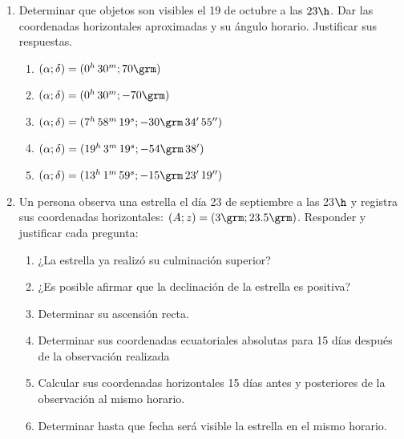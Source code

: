 \begin{enumerate}
  \item Determinar que objetos son visibles el 19 de octubre a las $23\h$. Dar
    las coordenadas horizontales aproximadas y su ángulo horario. Justificar sus
    respuestas.
    \begin{enumerate}
      \item $(\alpha;\delta)=(0^h\, 30^m;70\grm)$
      \item $(\alpha;\delta)=(0^h\, 30^m;-70\grm)$
      \item $(\alpha;\delta)=(7^h\, 58^m\, 19^s;-30\grm\, 34'\, 55'')$
      \item $(\alpha;\delta)=(19^h\, 3^m\, 19^s;-54\grm\,38')$
      \item $(\alpha;\delta)=(13^h\,1^m\,59^s; -15\grm\, 23'\, 19'')$
    \end{enumerate}

  \item Un persona observa una estrella el día 23 de septiembre a las 23$\h$ y
    registra sus coordenadas horizontales: $(A;z)=(3\grm;23.5\grm)$. Responder y
    justificar cada pregunta:
    \begin{enumerate}
      \item ¿La estrella ya realizó su culminación superior?
      \item ¿Es posible afirmar que la declinación de la estrella es positiva?
      \item Determinar su ascensión recta.
      \item Determinar sus coordenadas ecuatoriales absolutas para 15 días
	después de la observación realizada
      \item Calcular sus coordenadas horizontales 15 días antes y posteriores de
	la observación al mismo horario.
      \item Determinar hasta que fecha será visible la estrella en el mismo
	horario.
    \end{enumerate}
\end{enumerate}

